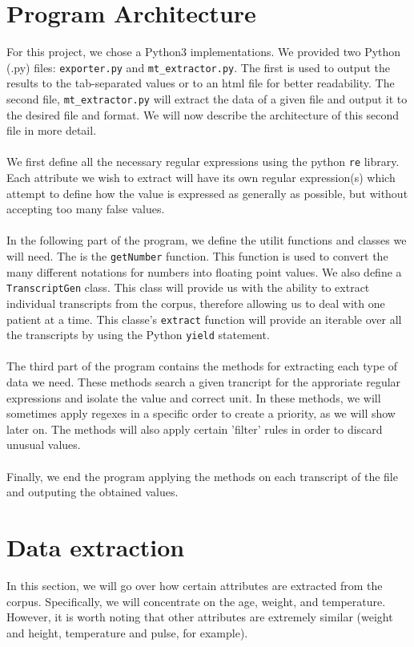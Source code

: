 \documentclass[10pt, a4paper, oneside]{article} %
\begin{document}
\section{Program Architecture}
For this project, we chose a Python3 implementations. We provided two Python (.py) files: \texttt{exporter.py} and \texttt{mt\_extractor.py}. The first is used to output the results to the tab-separated values or to an html file for better readability. The second file, \texttt{mt\_extractor.py} will extract the data of a given file and output it to the desired file and format. We will now describe the architecture of this second file in more detail. \\
\\
We first define all the necessary regular expressions using the python \texttt{re} library. Each attribute we wish to extract will have its own regular expression(s) which attempt to define how the value is expressed as generally as possible, but without accepting too many false values.\\
\\
In the following part of the program, we define the utilit functions and classes we will need. The is the \texttt{getNumber} function. This function is used to convert the many different notations for numbers into floating point values. We also define a \texttt{TranscriptGen} class. This class will provide us with the ability to extract individual transcripts from the corpus, therefore allowing us to deal with one patient at a time. This classe's \texttt{extract} function will provide an iterable over all the transcripts by using the Python \texttt{yield} statement.\\
\\
The third part of the program contains the methods for extracting each type of data we need. These methods search a given trancript for the approriate regular expressions and isolate the value and correct unit. In these methods, we will sometimes apply regexes in a specific order to create a priority, as we will show later on. The methods will also apply certain 'filter' rules in order to discard unusual values.\\
\\
Finally, we end the program applying the methods on each transcript of the file and outputing the obtained values.

\section{Data extraction}
In this section, we will go over how certain attributes are extracted from the corpus. Specifically, we will concentrate on the age, weight, and temperature. However, it is worth noting that other attributes are extremely similar (weight and height, temperature and pulse, for example).
\end{document}
